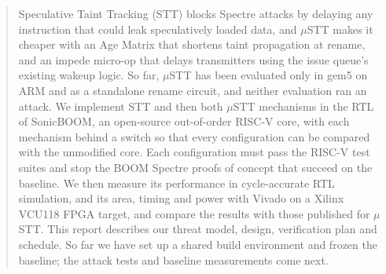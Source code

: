 \begin{abstract}

Speculative Taint Tracking (STT) blocks Spectre attacks by delaying any
instruction that could leak speculatively loaded data, and $\mu$STT makes
it cheaper with an Age Matrix that shortens taint
propagation at rename, and an impede micro-op that delays transmitters
using the issue queue's existing wakeup logic. So far, $\mu$STT has been
evaluated only in gem5 on ARM and as a standalone rename circuit, and
neither evaluation ran an attack. We implement STT and then both
$\mu$STT mechanisms in the RTL of SonicBOOM, an open-source out-of-order
RISC-V core, with each mechanism behind a switch so that every
configuration can be compared with the unmodified core. Each configuration
must pass the RISC-V test suites and stop the BOOM Spectre proofs of
concept that succeed on the baseline. We then measure its performance in
cycle-accurate RTL simulation, and its area, timing and power with Vivado
on a Xilinx VCU118 FPGA target, and compare the results with those
published for $\mu$STT. This report describes our threat model,
design, verification plan and schedule. So far we have set up a shared
build environment and frozen the baseline; the attack tests and baseline
measurements come next.
\end{abstract}
